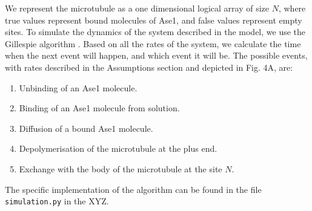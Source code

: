 \documentclass{article}
\begin{document}
We represent the microtubule as a one dimensional logical array of size $N$, where true values represent bound molecules of Ase1, and false values represent empty sites. To simulate the dynamics of the system described in the model, we use the Gillespie algorithm \cite{Gillespie1976}. Based on all the rates of the system, we calculate the time when the next event will happen, and which event it will be. The possible events, with rates described in the Assumptions section and depicted in Fig. 4A, are:
\begin{enumerate}
	\item Unbinding of an Ase1 molecule.
	\item Binding of an Ase1 molecule from solution.
	\item Diffusion of a bound Ase1 molecule.
	\item Depolymerisation of the microtubule at the plus end.
	\item Exchange with the body of the microtubule at the site $N$.
\end{enumerate}
The specific implementation of the algorithm can be found in the file \verb|simulation.py| in the XYZ.

%
%
%
%

\small


\end{document}
